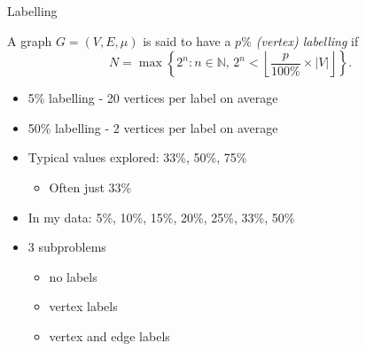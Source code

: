 \documentclass{beamer}
\begin{document}
\begin{frame}{Labelling}
  \begin{definition}
    A graph $G = (V, E, \mu)$ is said to have a \emph{$p\%$ (vertex) labelling} if
    \[ N = \max \left\{ 2^n : n \in \mathbb{N},\, 2^n < \left\lfloor \frac{p}{100\%}
          \times |V| \right\rfloor \right\}. \]
  \end{definition}
  \begin{itemize}
  \item 5\% labelling - 20 vertices per label on average
  \item 50\% labelling - 2 vertices per label on average
    \pause
  \item Typical values explored: 33\%, 50\%, 75\%
    \begin{itemize}
    \item Often just 33\%
    \end{itemize}
    \pause
  \item In my data: 5\%, 10\%, 15\%, 20\%, 25\%, 33\%, 50\%
    \pause
  \item 3 subproblems
    \begin{itemize}
    \item no labels
    \item vertex labels
    \item vertex and edge labels
    \end{itemize}
  \end{itemize}
\end{frame}

\end{document}
